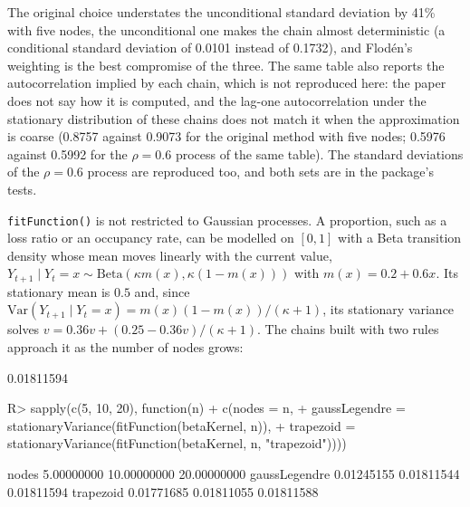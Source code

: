 \documentclass[
  nojss]{jss}
\begin{document}
The original choice understates the unconditional standard deviation by
41\% with five nodes, the unconditional one makes the chain almost
deterministic (a conditional standard deviation of 0.0101 instead of
0.1732), and Flodén's weighting is the best compromise of the three. The
same table also reports the autocorrelation implied by each chain, which is
not reproduced here: the paper does not say how it is computed, and the
lag-one autocorrelation under the stationary distribution of these chains
does not match it when the approximation is coarse (0.8757 against 0.9073 for
the original method with five nodes; 0.5976 against 0.5992 for the \(\rho=0.6\)
process of the same table). The standard deviations of the \(\rho=0.6\)
process are reproduced too, and both sets are in the package's tests.

\texttt{fitFunction()} is not restricted to Gaussian processes. A proportion, such
as a loss ratio or an occupancy rate, can be modelled on \([0, 1]\) with a
Beta transition density whose mean moves linearly with the current value,
\(Y_{t+1} \mid Y_t = x \sim \mathrm{Beta}(\kappa m(x), \kappa(1 - m(x)))\) with
\(m(x) = 0.2 + 0.6x\). Its stationary mean is \(0.5\) and, since
\(\mathrm{Var}(Y_{t+1}\mid Y_t=x) = m(x)(1-m(x))/(\kappa+1)\), its stationary
variance solves \(v = 0.36v + (0.25 - 0.36v)/(\kappa+1)\). The chains built with
two rules approach it as the number of nodes grows:

\begin{CodeChunk}
\begin{CodeOutput}
[1] 0.01811594
\end{CodeOutput}
\begin{CodeInput}
R> sapply(c(5, 10, 20), function(n)
+   c(nodes = n,
+     gaussLegendre = stationaryVariance(fitFunction(betaKernel, n)),
+     trapezoid = stationaryVariance(fitFunction(betaKernel, n, "trapezoid"))))
\end{CodeInput}
\begin{CodeOutput}
                    [,1]        [,2]        [,3]
nodes         5.00000000 10.00000000 20.00000000
gaussLegendre 0.01245155  0.01811544  0.01811594
trapezoid     0.01771685  0.01811055  0.01811588
\end{CodeOutput}
\end{CodeChunk}
\end{document}
